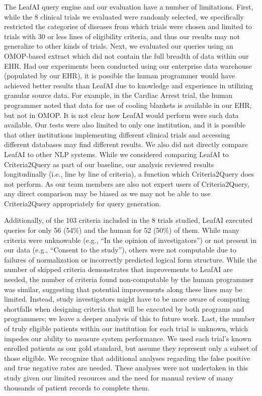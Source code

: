 \documentclass[../main.tex]{subfiles}
\begin{document}
The LeafAI query engine and our evaluation have a number of limitations. First, while the 8 clinical trials we evaluated were randomly selected, we specifically restricted the categories of diseases from which trials were chosen and limited to trials with 30 or less lines of eligibility criteria, and thus our results may not generalize to other kinds of trials. Next, we evaluated our queries using an OMOP-based extract which did not contain the full breadth of data within our EHR. Had our experiments been conducted using our enterprise data warehouse (populated by our EHR), it is possible the human programmer would have achieved better results than LeafAI due to knowledge and experience in utilizing granular source data. For example, in the Cardiac Arrest trial, the human programmer noted that data for use of cooling blankets is available in our EHR, but not in OMOP. It is not clear how LeafAI would perform were such data available. Our tests were also limited to only one institution, and it is possible that other institutions implementing different clinical trials and accessing different databases may find different results. We also did not directly compare LeafAI to other NLP systems. While we considered comparing LeafAI to Criteria2Query \cite{yuan2019criteria2query} as part of our baseline, our analysis reviewed results longitudinally (i.e., line by line of criteria), a function which Criteria2Query does not perform. As our team members are also not expert users of Criteria2Query, any direct comparison may be biased as we may not be able to use Criteria2Query appropriately for query generation. 

Additionally, of the 103 criteria included in the 8 trials studied, LeafAI executed queries for only 56 (54\%) and the human for 52 (50\%) of them. While many criteria were unknowable (e.g., “In the opinion of investigators”) or not present in our data (e.g., “Consent to the study”), others were not computable due to failures of normalization or incorrectly predicted logical form structure. While the number of skipped criteria demonstrates that improvements to LeafAI are needed, the number of criteria found non-computable by the human programmer was similar, suggesting that potential improvements along these lines may be limited. Instead, study investigators might have to be more aware of computing shortfalls when designing criteria that will be executed by both programs and programmers; we leave a deeper analysis of this to future work. Last, the number of truly eligible patients within our institution for each trial is unknown, which impedes our ability to measure system performance. We used each trial’s known enrolled patients as our gold standard, but assume they represent only a subset of those eligible. We recognize that additional analyses regarding the false positive and true negative rates are needed. These analyses were not undertaken in this study given our limited resources and the need for manual review of many thousands of patient records to complete them.
\end{document}
